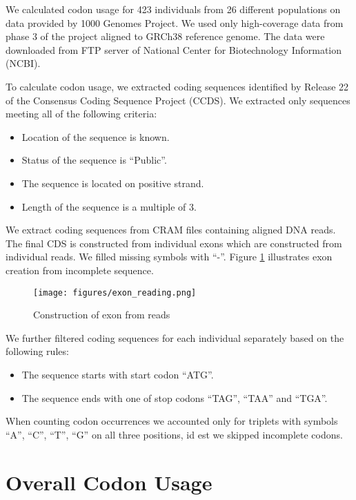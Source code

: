 \documentclass{article}
\begin{document}
We calculated codon usage for 423 individuals from 26 different populations on
data provided by 1000 Genomes Project\cite{1000genomes}. We used only
high-coverage data from phase 3 of the project aligned to
GRCh38\cite{Schneider072116} reference genome. The data were downloaded from
FTP server of National Center for Biotechnology Information (NCBI).

To calculate codon usage, we extracted coding sequences identified by Release
22 of the Consensus Coding Sequence Project (CCDS)\cite{pruitt2009consensus}.
We extracted only sequences meeting all of the following criteria:

\begin{itemize}
\item Location of the sequence is known.
\item Status of the sequence is ``Public''.
\item The sequence is located on positive strand.
\item Length of the sequence is a multiple of 3.
\end{itemize}

We extract coding sequences from CRAM files containing aligned DNA reads. The
final CDS is constructed from individual exons which are constructed from
individual reads. We filled missing symbols with ``-''. Figure \ref{fig:cram}
illustrates exon creation from incomplete sequence.

\begin{figure}[h]
  \centering
  \texttt{[image: figures/exon\_reading.png]}
  \caption{Construction of exon from reads}
  \label{fig:cram}
\end{figure}

We further filtered coding sequences for each individual separately based on
the following rules:

\begin{itemize}
\item The sequence starts with start codon ``ATG''.
\item The sequence ends with one of stop codons ``TAG'', ``TAA'' and ``TGA''.
\end{itemize}

When counting codon occurrences we accounted only for triplets with symbols
``A'', ``C'', ``T'', ``G'' on all three positions, id est we skipped incomplete
codons.

\section{Overall Codon Usage}
\end{document}
